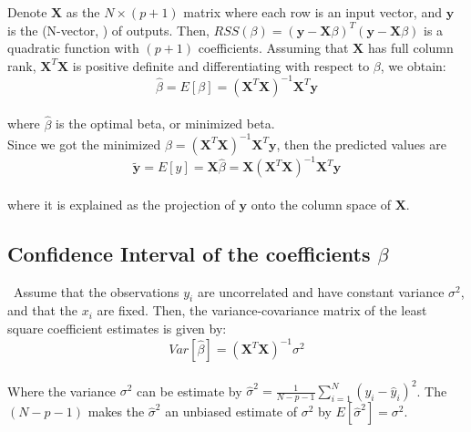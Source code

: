 Denote $\textbf{X}$ as the $N\times(p+1)$ matrix where each row is an input vector, and $\textbf{y}$ is the (N-vector, ) of outputs. Then, $RSS(\beta)=(\textbf{y}-\textbf{X}\beta)^T(\textbf{y}-\textbf{X}\beta)$ is a quadratic function with $(p+1)$ coefficients. Assuming that $\textbf{X}$ has full column rank, $\textbf{X}^T\textbf{X}$ is positive definite and differentiating with respect to $\beta$, we obtain:\\

\begin{equation}
\label{eq3}
\hat{\beta}=E[\beta]=(\textbf{X}^T\textbf{X})^{-1}\textbf{X}^T\textbf{y}
\end{equation}\\

\noindent where $\hat{\beta}$ is the optimal beta, or minimized beta.\\

Since we got the minimized $\hat{\beta}=(\textbf{X}^T\textbf{X})^{-1}\textbf{X}^T\textbf{y}$, then the predicted values are\\

\begin{equation}
\label{eq4}
\tilde{\textbf{y}}=E[y]=\textbf{X}\hat{\beta}=\textbf{X}(\textbf{X}^T\textbf{X})^{-1}\textbf{X}^T\textbf{y}
\end{equation}\\

\noindent where it is explained as the projection of $\textbf{y}$ onto the column space of $\textbf{X}$.\\

\subsection{Confidence Interval of the coefficients $\beta$}
\label{chap:Confidence Interval of the coefficients $\beta$}

\qquad \, Assume that the observations $y_i$ are uncorrelated and have constant variance $\sigma^2$, and that the $x_i$ are fixed. Then, the variance-covariance matrix of the least square coefficient estimates is given by: \\

\begin{equation}
\label{eq5}
Var[\hat{\beta}]=(\textbf{X}^T\textbf{X})^{-1}\sigma^2
\end{equation}\\

Where the variance $\sigma^2$ can be estimate by $\hat{\sigma}^2=\frac{1}{N-p-1}\sum^N_{i=1}(y_i-\hat{y}_i)^2$. The $(N-p-1)$ makes the $\hat{\sigma}^2$ an unbiased estimate of $\sigma^2$ by $E[\hat{\sigma}^2]=\sigma^2$.\\

